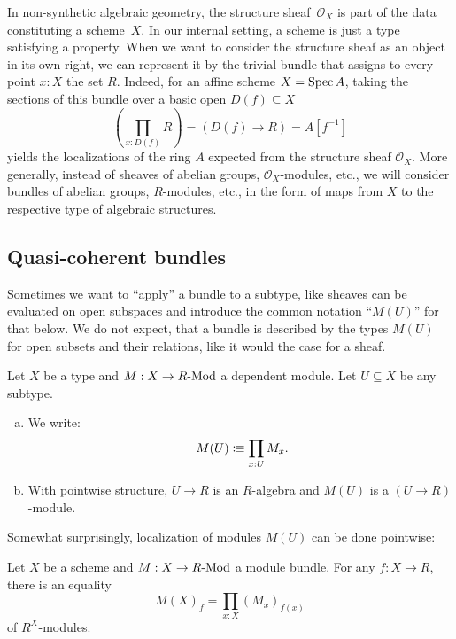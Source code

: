 In non-synthetic algebraic geometry,
the structure sheaf~$\mathcal{O}_X$ is part of the data constituting a scheme~$X$.
In our internal setting,
a scheme is just a type satisfying a property.
When we want to consider the structure sheaf as an object in its own right,
we can represent it by the trivial bundle
that assigns to every point $x : X$ the set $R$.
Indeed, for an affine scheme $X = \operatorname{Spec} A$,
taking the sections of this bundle over a basic open $D(f) \subseteq X$
\[ \left(\prod_{x : D(f)} R\right) = (D(f) \to R) = A[f^{-1}] \]
yields the localizations of the ring $A$
expected from the structure sheaf $\mathcal{O}_X$.
More generally,
instead of sheaves of abelian groups, $\mathcal{O}_X$-modules, etc.,
we will consider bundles of abelian groups, $R$-modules, etc.,
in the form of maps from $X$ to the respective type of algebraic structures.

\subsection{Quasi-coherent bundles}

Sometimes we want to ``apply'' a bundle to a subtype,
like sheaves can be evaluated on open subspaces
and introduce the common notation ``$M(U)$'' for that below.
We do not expect, that a bundle is described by the types $M(U)$ for open subsets and their relations,
like it would the case for a sheaf.

\begin{definition}
  \label{application-of-bundle-to-subtype}
  Let $X$ be a type and $M:X\to R\text{-}\mathrm{Mod}$ a dependent module.
  Let $U\subseteq X$ be any subtype.
  \begin{enumerate}[(a)]
  \item We write:
    \[
      M(U)\colonequiv \prod_{x:U}M_x
      \rlap{.}
    \]
  \item With pointwise structure, $U\to R$ is an $R$-algebra
    and $M(U)$ is a $(U\to R)$-module.
  \end{enumerate}
\end{definition}

Somewhat surprisingly, localization of modules $M(U)$
can be done pointwise:

\begin{lemma}%
  \label{module-bundle-localization-pointwise}
  Let $X$ be a scheme and $M:X\to R\text{-}\mathrm{Mod}$ a module bundle.
  For any $f:X\to R$, there is an equality
  \[
    M(X)_f=\prod_{x:X}(M_x)_{f(x)}
  \]
  of $R^X$-modules.
\end{lemma}

